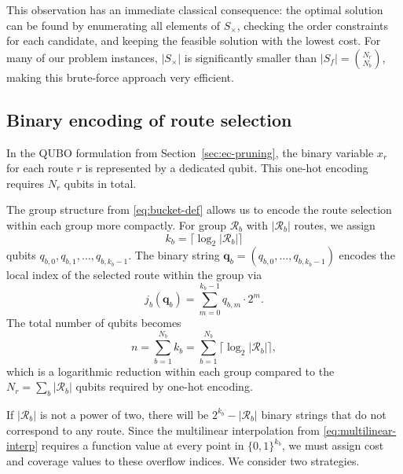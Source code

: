 \documentclass{article}
\begin{document}
This observation has an immediate classical consequence: the optimal solution can be found by enumerating all elements of $S_{\times}$, checking the order constraints for each candidate, and keeping the feasible solution with the lowest cost. For many of our problem instances, $|S_{\times}|$ is significantly smaller than $|S_f| = \binom{N_r}{N_b}$, making this brute-force approach very efficient.


\subsection{Binary encoding of route selection}
\label{sec:binary-encoding-def}

In the QUBO formulation from Section~\ref{sec:ec-pruning}, the binary variable $x_r$ for each route $r$ is represented by a dedicated qubit. This one-hot encoding requires $N_r$ qubits in total.

The group structure from \eqref{eq:bucket-def} allows us to encode the route selection within each group more compactly. For group $\mathcal{R}_b$ with $|\mathcal{R}_b|$ routes, we assign
\begin{equation}
    k_b = \lceil \log_2 |\mathcal{R}_b| \rceil
    \label{eq:qubits-per-bucket}
\end{equation}
qubits $q_{b,0}, q_{b,1}, \ldots, q_{b,k_b - 1}$. The binary string $\mathbf{q}_b = (q_{b,0}, \ldots, q_{b,k_b-1})$ encodes the local index of the selected route within the group via
\begin{equation}
    j_b(\mathbf{q}_b) = \sum_{m=0}^{k_b - 1} q_{b,m} \cdot 2^m.
    \label{eq:binary-index}
\end{equation}
The total number of qubits becomes
\begin{equation}
    n = \sum_{b=1}^{N_b} k_b = \sum_{b=1}^{N_b} \lceil \log_2 |\mathcal{R}_b| \rceil,
    \label{eq:total-qubits}
\end{equation}
which is a logarithmic reduction within each group compared to the $N_r = \sum_b |\mathcal{R}_b|$ qubits required by one-hot encoding.

If $|\mathcal{R}_b|$ is not a power of two, there will be $2^{k_b} - |\mathcal{R}_b|$ binary strings that do not correspond to any route. Since the multilinear interpolation from \eqref{eq:multilinear-interp} requires a function value at every point in $\{0,1\}^{k_b}$, we must assign cost and coverage values to these overflow indices. We consider two strategies.
\end{document}
